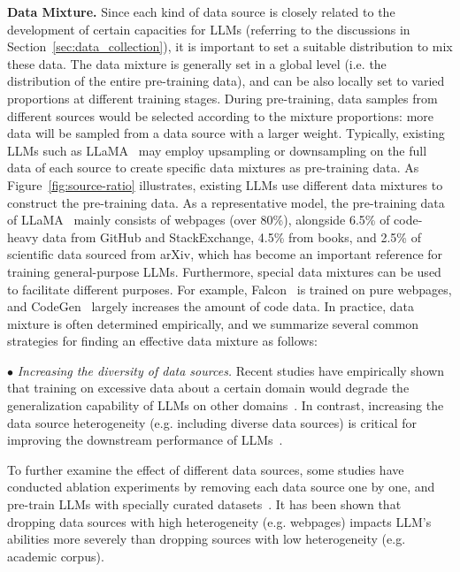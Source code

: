 \textbf{Data Mixture.} Since each kind of data source is closely related to the development of certain capacities for  LLMs (referring to the discussions in Section~\ref{sec:data_collection}), it is important to set a suitable  distribution to mix these data. The data mixture is generally set in a global level (i.e. the distribution of the entire pre-training data), and can be also locally set to varied  proportions at different training stages. During pre-training, data samples from different sources would be selected according to the mixture proportions: more data will be sampled from a data source with a larger weight. Typically, existing LLMs such as LLaMA~\cite{Touvron-arxiv-2023-LLaMA} may employ upsampling or downsampling on the full data of each source to create specific data mixtures as pre-training data. As Figure~\ref{fig:source-ratio} illustrates, existing LLMs use different data mixtures to construct the pre-training data. As a representative model, the pre-training data of LLaMA~\cite{Touvron-arxiv-2023-LLaMA} mainly consists of webpages (over 80\%),  alongside 6.5\% of code-heavy data from GitHub and StackExchange, 4.5\% from books, and 2.5\% of scientific data sourced from arXiv, which has become an important reference for training  general-purpose LLMs. Furthermore, special data mixtures can be used to facilitate different purposes. For example, Falcon~\cite{Penedo-2023-arxiv-Refinedweb} is trained on pure webpages, and CodeGen~\cite{nijkamp-arxiv-2022-Codegen} largely increases the amount of code data. In practice, data mixture is often determined empirically, and we summarize several common strategies for finding an effective data mixture as follows: 

$\bullet$ \emph{Increasing the diversity of data sources.} Recent studies have empirically shown that training on excessive data about a certain domain would degrade the generalization capability of LLMs on other domains~\cite{Taylor-arxiv-2022-Galactica,Rae-arxiv-2021-Scaling}. In contrast, increasing the data source heterogeneity (e.g. including diverse data sources) is critical for improving the downstream performance of LLMs~\cite{Longpre-arxiv-2023-pretrainer,Tirumala-2023-arXiv-D4,Shen-2023-arXiv-SlimPajamaDC}. 

To further examine the effect of different data sources, some studies  have conducted ablation experiments by removing  each data source one by one,  and pre-train LLMs with specially curated datasets~\cite{Longpre-arxiv-2023-pretrainer}. It has been shown  that dropping data sources with high heterogeneity (e.g. webpages) impacts LLM's abilities more severely than dropping sources with low heterogeneity (e.g. academic corpus).

